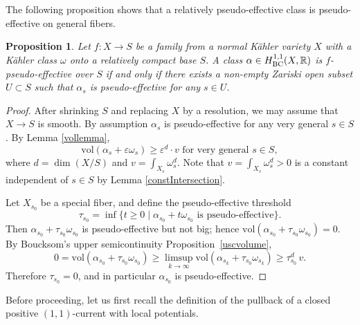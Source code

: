 \documentclass[12pt]{amsart}
\numberwithin{equation}{section}
\newtheorem{proposition}[theorem]{Proposition}
\theoremstyle{definition}
\theoremstyle{plain}
\newtheorem*{thm A*}{Theorem A}
\newtheorem*{thm B*}{Theorem B}
\newtheorem*{thm C*}{Theorem C}
\newtheorem*{thm D*}{Theorem D}
\theoremstyle{definition}
\renewcommand{\1}{\mathds{1}}
\newcommand{\vol}{\mathrm{vol}}
\renewcommand{\>}{\rightarrow}
\begin{document}
The following proposition shows that a relatively pseudo-effective class is pseudo-effective on general fibers.
\begin{proposition}\label{genericpseff}
Let $f:X\to S$ be a family from a normal K\"ahler variety $X$ with a K\"ahler class $\omega$ onto a relatively compact base $S$. A class $\alpha \in H^{1,1}_{\rm{BC}}(X, \mathbb{R})$ is $f$-pseudo-effective over $S$ if and only if there exists a non-empty Zariski open subset $U \subset S$ such that $\alpha_s$ is pseudo-effective for any $s\in U$. 
\end{proposition}
\begin{proof}
After shrinking $S$ and replacing $X$ by a resolution,  we may assume that $X\to S$ is smooth. By assumption $\alpha _s$ is pseudo-effective for any very general $s\in S$.
By Lemma \ref{vollemma}, $$\vol(\alpha _s+\varepsilon \omega _s)  \ge \varepsilon ^d \cdot v \text{ for very general } s\in S,$$ where $d=\dim (X/S)$ and $v=\int _{X_s}\omega _s^d$. Note that $v= \int_{X_s} \omega_s^d>0$ is a constant independent of $s\in S$ by Lemma \ref{constIntersection}. 

Let $X_{s_0}$ be a special fiber, and define the pseudo-effective threshold
\[
\tau_{s_0} = \inf \{ t \ge 0 \mid \alpha_{s_0} + t \omega_{s_0} \text{ is pseudo-effective} \}.
\]
Then $\alpha_{s_0} + \tau_{s_0} \omega_{s_0}$ is pseudo-effective but not big; hence $
\vol(\alpha_{s_0} + \tau_{s_0} \omega_{s_0}) = 0$. 
By Boucksom's upper semicontinuity Proposition~\ref{uscvolume},
\[
0 = \vol(\alpha_{s_0} + \tau_{s_0} \omega_{s_0})
\ge \limsup_{k \to \infty} \vol(\alpha_{s_k} + \tau_{s_0} \omega_{s_k})
\ge \tau_{s_0}^d \, v.
\]
Therefore $\tau_{s_0} = 0$, and in particular $\alpha_{s_0}$ is pseudo-effective.
\end{proof}

Before proceeding, let us first recall the definition of the pullback of a closed positive $(1,1)$-current with local potentials. 
\end{document}
